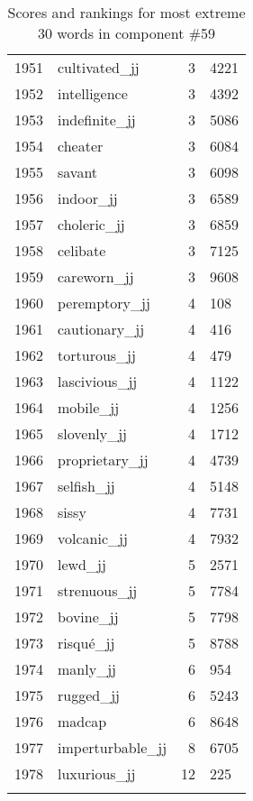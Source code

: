 \begin{longtable}[!htbp]{| rlr@{.}l |}
    1951 & cultivated\_jj & 3 & 4221 \\
    1952 & intelligence & 3 & 4392 \\
    1953 & indefinite\_jj & 3 & 5086 \\
    1954 & cheater & 3 & 6084 \\
    1955 & savant & 3 & 6098 \\
    1956 & indoor\_jj & 3 & 6589 \\
    1957 & choleric\_jj & 3 & 6859 \\
    1958 & celibate & 3 & 7125 \\
    1959 & careworn\_jj & 3 & 9608 \\
    1960 & peremptory\_jj & 4 & 108 \\
    1961 & cautionary\_jj & 4 & 416 \\
    1962 & torturous\_jj & 4 & 479 \\
    1963 & lascivious\_jj & 4 & 1122 \\
    1964 & mobile\_jj & 4 & 1256 \\
    1965 & slovenly\_jj & 4 & 1712 \\
    1966 & proprietary\_jj & 4 & 4739 \\
    1967 & selfish\_jj & 4 & 5148 \\
    1968 & sissy & 4 & 7731 \\
    1969 & volcanic\_jj & 4 & 7932 \\
    1970 & lewd\_jj & 5 & 2571 \\
    1971 & strenuous\_jj & 5 & 7784 \\
    1972 & bovine\_jj & 5 & 7798 \\
    1973 & risqué\_jj & 5 & 8788 \\
    1974 & manly\_jj & 6 & 954 \\
    1975 & rugged\_jj & 6 & 5243 \\
    1976 & madcap & 6 & 8648 \\
    1977 & imperturbable\_jj & 8 & 6705 \\
    1978 & luxurious\_jj & 12 & 225 \\
    \hline
    \caption{Scores and rankings for most extreme 30 words in component \#59} \\
\end{longtable}

